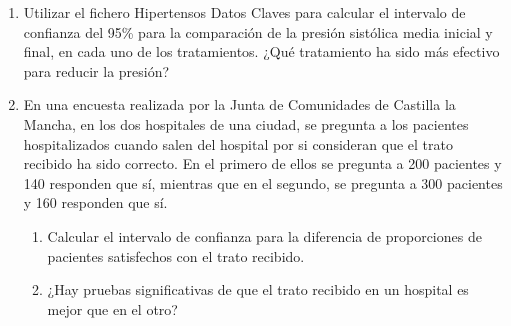\begin{enumerate}[leftmargin=*]
\item Utilizar el fichero \textsf{Hipertensos Datos Claves} para calcular el intervalo de confianza del 95\% para la
comparación de la presión sistólica media inicial y final, en cada uno de los tratamientos. ¿Qué tratamiento ha sido más
efectivo para reducir la presión?

\item En una encuesta realizada por la Junta de Comunidades de Castilla la Mancha, en los dos hospitales de una ciudad,
se pregunta a los pacientes hospitalizados cuando salen del hospital por si consideran que el trato recibido ha sido
correcto. En el primero de ellos se pregunta a 200 pacientes y 140 responden que sí, mientras que en el segundo, se
pregunta a 300 pacientes y 160 responden que sí.

\begin{enumerate}
\item Calcular el intervalo de confianza para la diferencia de proporciones de pacientes satisfechos con el trato
recibido.
\item ¿Hay pruebas significativas de que el trato recibido en un hospital es mejor que en el otro?
\end{enumerate}
\end{enumerate}
